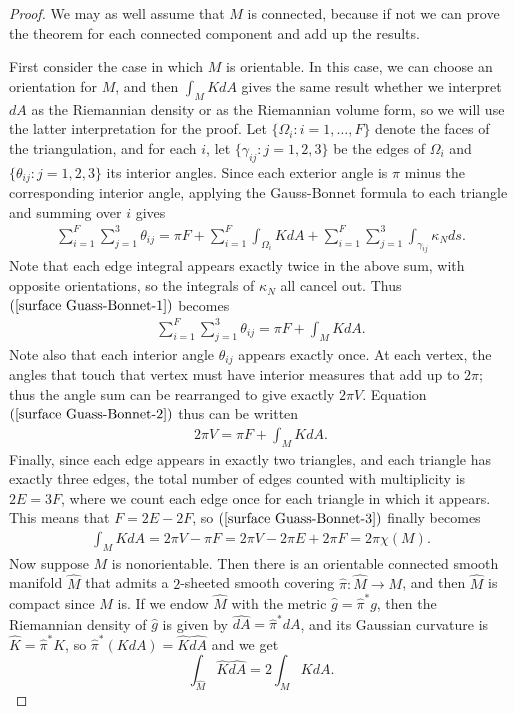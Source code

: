 \begin{proof}
We may as well assume that $M$ is connected, because if not we can prove the theorem for each connected component and add up the results.\par
First consider the case in which $M$ is orientable. In this case, we can choose an orientation for $M$, and then $\int_MKdA$ gives the same result whether we interpret 
$dA$ as the Riemannian density or as the Riemannian volume form, so we will use the latter interpretation for the proof. Let $\{\Omega_i:i=1,\dots,F\}$ denote the faces 
of the triangulation, and for each $i$, let $\{\gamma_{ij}:j=1,2,3\}$ be the edges of $\Omega_i$ and $\{\theta_{ij}:j=1,2,3\}$ its interior angles. Since each exterior 
angle is $\pi$ minus the corresponding interior angle, applying the Gauss-Bonnet formula to each triangle and summing over $i$ gives
\begin{align}\label{surface Guass-Bonnet-1}
\sum_{i=1}^{F}\sum_{j=1}^{3}\theta_{ij}=\pi F+\sum_{i=1}^{F}\int_{\Omega_i}KdA+\sum_{i=1}^{F}\sum_{j=1}^{3}\int_{\gamma_{ij}}\kappa_Nds.
\end{align}
Note that each edge integral appears exactly twice in the above sum, with opposite orientations, so the integrals of $\kappa_N$ all cancel out. Thus $(\ref{surface Guass-Bonnet-1})$ 
becomes
\begin{align}\label{surface Guass-Bonnet-2}
\sum_{i=1}^{F}\sum_{j=1}^{3}\theta_{ij}=\pi F+\int_{M}KdA.
\end{align}
Note also that each interior angle $\theta_{ij}$ appears exactly once. At each vertex, the angles that touch that vertex must have interior measures that add up to $2\pi$; 
thus the angle sum can be rearranged to give exactly $2\pi V$. Equation $(\ref{surface Guass-Bonnet-2})$ thus can be written
\begin{align}\label{surface Guass-Bonnet-3}
2\pi V=\pi F+\int_{M}KdA.
\end{align}
Finally, since each edge appears in exactly two triangles, and each triangle has exactly three edges, the total number of edges counted with multiplicity is $2E=3F$, where 
we count each edge once for each triangle in which it appears. This means that $F=2E-2F$, so $(\ref{surface Guass-Bonnet-3})$ finally becomes
\begin{align*}
\int_MKdA=2\pi V-\pi F=2\pi V-2\pi E+2\pi F=2\pi\chi(M).
\end{align*}
Now suppose $M$ is nonorientable. Then there is an orientable connected smooth manifold $\widehat{M}$ that admits a $2$-sheeted smooth covering $\hat{\pi}:\widehat{M}\to M$, and then $\widehat{M}$ is compact since $M$ is. If we endow $\widehat{M}$ with the metric $\hat{g}=\hat{\pi}^*g$, then the Riemannian density of $\hat{g}$ is given by $\widehat{dA}=\hat{\pi}^*dA$, and its Gaussian curvature is $\hat{K}=\hat{\pi}^*K$, so $\hat{\pi}^*(KdA)=\hat{K}\widehat{dA}$ and we get
\[\int_{\widehat{M}}\hat{K}\widehat{dA}=2\int_MKdA.\]


\end{proof}
